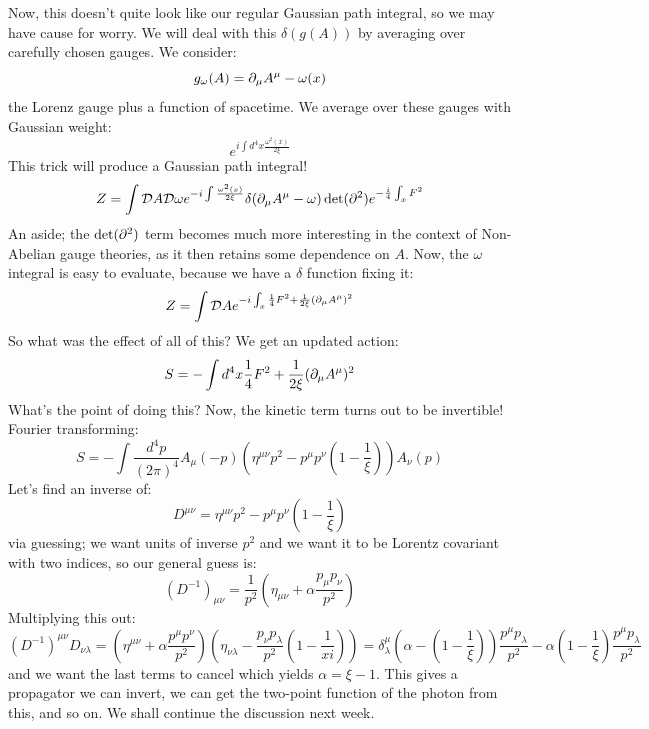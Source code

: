 Now, this doesn't quite look like our regular Gaussian path integral, so we may have cause for worry. We will deal with this $\delta(g(A))$ by averaging over carefully chosen gauges. We consider:
\begin{equation}
    g_\omega(A) = \partial_\mu A^\mu - \omega(x)
\end{equation}
the Lorenz gauge plus a function of spacetime. We average over these gauges with Gaussian weight:
\begin{equation}
    e^{i \int d^4x \frac{\omega^2(x)}{2\xi}}
\end{equation}
This trick will produce a Gaussian path integral!
\begin{equation}
    Z = \int \mathcal{D}A\mathcal{D}\omega e^{-i\int \frac{\omega^2(x)}{2\xi}}\delta(\partial_\mu A^\mu - \omega)\det(\partial^2)e^{-\frac{i}{4}\int_x F^2}
\end{equation}
An aside; the $\det(\partial^2)$ term becomes much more interesting in the context of Non-Abelian gauge theories, as it then retains some dependence on $A$. Now, the $\omega$ integral is easy to evaluate, because we have a $\delta$ function fixing it:
\begin{equation}
    Z = \int \mathcal{D}Ae^{-i\int_x \frac{1}{4}F^2 + \frac{1}{2\xi}(\partial_\mu A^\mu)^2}
\end{equation}
So what was the effect of all of this? We get an updated action:
\begin{equation}
    S = -\int d^4x \frac{1}{4}F^2 + \frac{1}{2\xi}(\partial_\mu A^\mu)^2
\end{equation}
What's the point of doing this? Now, the kinetic term turns out to be invertible! Fourier transforming:
\begin{equation}
    S = -\int \frac{d^4p}{(2\pi)^4}A_\mu(-p)(\eta^{\mu\nu}p^2 - p^\mu p^\nu(1 - \frac{1}{\xi}))A_\nu(p)
\end{equation}
Let's find an inverse of:
\begin{equation}
    D^{\mu\nu} = \eta^{\mu\nu}p^2 - p^\mu p^\nu(1 - \frac{1}{\xi})
\end{equation}
via guessing; we want units of inverse $p^2$ and we want it to be Lorentz covariant with two indices, so our general guess is:
\begin{equation}
    (D^{-1})_{\mu\nu} = \frac{1}{p^2}(\eta_{\mu\nu} + \alpha\frac{p_\mu p_\nu}{p^2})
\end{equation}
Multiplying this out:
\begin{equation}
    (D^{-1})^{\mu\nu}D_{\nu\lambda} = (\eta^{\mu\nu} + \alpha\frac{p^{\mu}p^\nu}{p^2})(\eta_{\nu\lambda} - \frac{p_\nu p_\lambda}{p^2}(1 - \frac{1}{xi})) = \delta^{\mu}_\lambda \left(\alpha - \left(1 - \frac{1}{\xi}\right)\right)\frac{p^\mu p_\lambda}{p^2} - \alpha(1 - \frac{1}{\xi})\frac{p^\mu p_\lambda}{p^2}
\end{equation}
and we want the last terms to cancel which yields $\alpha = \xi - 1$. This gives a propagator we can invert, we can get the two-point function of the photon from this, and so on. We shall continue the discussion next week.